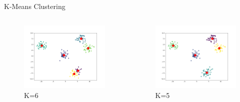 \documentclass{beamer}
\begin{document}
\begin{frame}{K-Means Clustering}
\begin{columns}[T]
  \begin{column}{0.5\textwidth}
    \begin{figure}
      \includegraphics[width=.8\textwidth]{unsupervised/k_ex_6.png}
      \vspace*{-0.3cm}
      \caption{K=6}
    \end{figure}
  \end{column}
  \begin{column}{0.5\textwidth}
    \begin{figure}
      \includegraphics[width=.8\textwidth]{unsupervised/k_ex_5.png}
      \vspace*{-0.3cm}
      \caption{K=5}
    \end{figure}
  \end{column}
\end{columns}
\vspace*{-0.5cm}

\end{frame}
\end{document}
